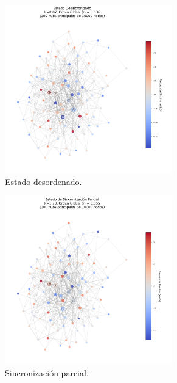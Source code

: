 \documentclass[12pt, a4paper]{article}
\begin{document}
\begin{figure}[htbp]
    \centering
    \begin{subfigure}[b]{\textwidth}
        \centering
        \includegraphics[width=0.8\textwidth]{img/3_1.png}
        \caption{Estado desordenado.}
    \end{subfigure}
    \begin{subfigure}[b]{\textwidth}
        \centering
        \includegraphics[width=0.8\textwidth]{img/3_2.png}
        \caption{Sincronización parcial.}
    \end{subfigure}
    \begin{subfigure}[b]{\textwidth}

\end{subfigure}
\end{figure}
\end{document}
